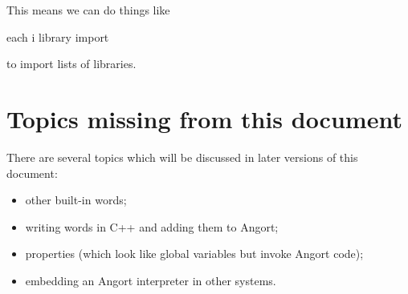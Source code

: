 This means we can do things like
\begin{v}
[`id3, `mpc, `io] each {i library import}
\end{v}
to import lists of libraries.

\section{Topics missing from this document}
There are several topics which will be discussed in later versions
of this document:
\begin{itemize}
\item other built-in words;
\item writing words in C++ and adding them to Angort;
\item properties (which look like global variables but invoke Angort code);
\item embedding an Angort interpreter in other systems.
\end{itemize}




